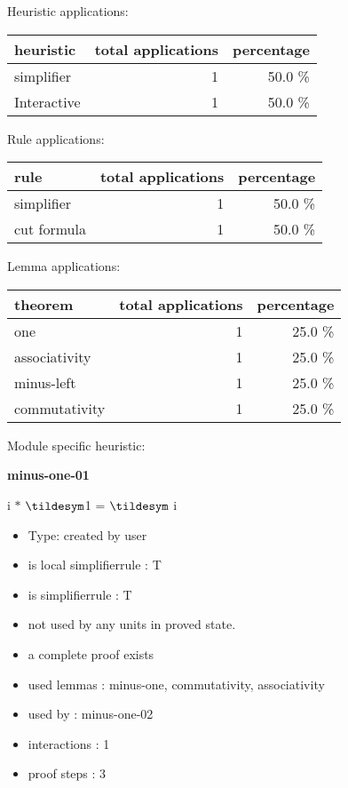 \documentclass[a4paper]{article}
\begin{document}
\medskip


Heuristic applications:

\begin{supertabular}{l|r|r}
heuristic	& total applications & percentage \\ \hline
simplifier & 1 & 50.0 \% \\
Interactive & 1 & 50.0 \% \\

\end{supertabular}

Rule applications:

\begin{supertabular}{l|r|r}
rule	        & total applications & percentage \\ \hline
simplifier & 1 & 50.0 \% \\
cut formula & 1 & 50.0 \% \\

\end{supertabular}

Lemma applications:

\begin{supertabular}{l|r|r}
theorem	        & total applications & percentage \\ \hline
one & 1 & 25.0 \% \\
associativity & 1 & 25.0 \% \\
minus-left & 1 & 25.0 \% \\
commutativity & 1 & 25.0 \% \\

\end{supertabular}

Module specific heuristic:

\pagebreak

{\LARGE\bf minus-one-01}\label{lemma-minus-one-01}

\medskip

 \Fol i $*$ $\tildesym$1 = $\tildesym$ i

\begin{itemize}

\item Type: created by user

\item is local simplifierrule : T
\item is simplifierrule : T
\item not used by any units in proved state.
\item       a complete proof exists
\item       used lemmas  : minus-one, commutativity, associativity
\item       used by      : minus-one-02
\item       interactions : 1
\item       proof steps  : 3
\end{itemize}
\end{document}
